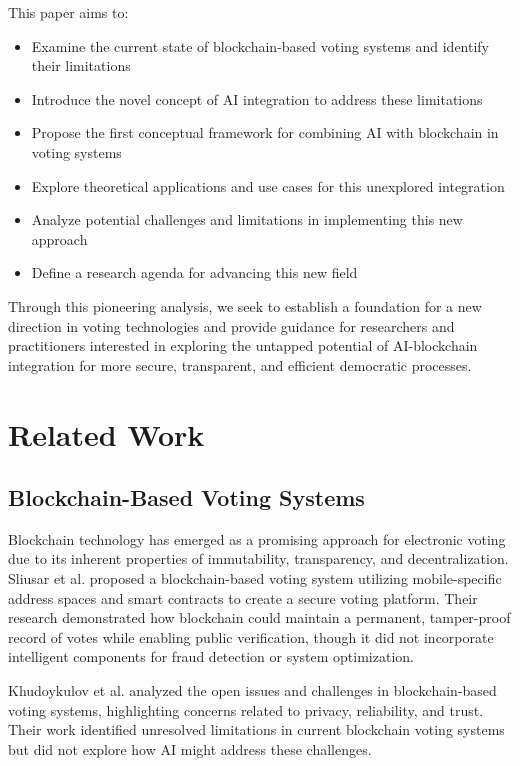 \documentclass[conference]{IEEEtran}
\begin{document}
This paper aims to:
\begin{itemize}
    \item Examine the current state of blockchain-based voting systems and identify their limitations
    \item Introduce the novel concept of AI integration to address these limitations
    \item Propose the first conceptual framework for combining AI with blockchain in voting systems
    \item Explore theoretical applications and use cases for this unexplored integration
    \item Analyze potential challenges and limitations in implementing this new approach
    \item Define a research agenda for advancing this new field
\end{itemize}

Through this pioneering analysis, we seek to establish a foundation for a new direction in voting technologies and provide guidance for researchers and practitioners interested in exploring the untapped potential of AI-blockchain integration for more secure, transparent, and efficient democratic processes.

\section{Related Work}
\subsection{Blockchain-Based Voting Systems}
Blockchain technology has emerged as a promising approach for electronic voting due to its inherent properties of immutability, transparency, and decentralization. Sliusar et al. \cite{b4} proposed a blockchain-based voting system utilizing mobile-specific address spaces and smart contracts to create a secure voting platform. Their research demonstrated how blockchain could maintain a permanent, tamper-proof record of votes while enabling public verification, though it did not incorporate intelligent components for fraud detection or system optimization.

Khudoykulov et al. \cite{b1} analyzed the open issues and challenges in blockchain-based voting systems, highlighting concerns related to privacy, reliability, and trust. Their work identified unresolved limitations in current blockchain voting systems but did not explore how AI might address these challenges.
\end{document}
